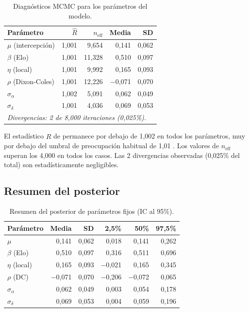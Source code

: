 \documentclass[12pt,a4paper]{article}
\begin{document}
\begin{table}[H]
\centering
\caption{Diagnósticos MCMC para los parámetros del modelo.}
\label{tab:diagnostics}
\begin{tabular}{lrrrr}
\toprule
\textbf{Parámetro} & $\hat{R}$ & $n_{\text{eff}}$ & \textbf{Media} & \textbf{SD} \\
\midrule
$\mu$ (intercepción)  & 1{,}001 & 9{,}654  &  0{,}141 & 0{,}062 \\
$\beta$ (Elo)         & 1{,}001 & 11{,}328 &  0{,}510 & 0{,}097 \\
$\eta$ (local)        & 1{,}001 &  9{,}992 &  0{,}165 & 0{,}093 \\
$\rho$ (Dixon-Coles)  & 1{,}001 & 12{,}226 & $-$0{,}071 & 0{,}070 \\
$\sigma_\alpha$       & 1{,}002 &  5{,}091 &  0{,}062 & 0{,}049 \\
$\sigma_\delta$       & 1{,}001 &  4{,}036 &  0{,}069 & 0{,}053 \\
\midrule
\multicolumn{5}{l}{\textit{Divergencias: 2 de 8{,}000 iteraciones (0{,}025\%).}} \\
\bottomrule
\end{tabular}
\end{table}

El estadístico $\hat{R}$ de \citet{gelman1992inference} permanece por debajo
de 1{,}002 en todos los parámetros, muy por debajo del umbral de preocupación
habitual de 1{,}01 \citep{vehtari2021rank}.
Los valores de $n_{\text{eff}}$ superan los 4{,}000 en todos los casos.
Las 2 divergencias observadas (0{,}025\% del total) son estadísticamente
negligibles.

\subsection{Resumen del posterior}

\begin{table}[H]
\centering
\caption{Resumen del posterior de parámetros fijos (IC al 95\%).}
\label{tab:posterior}
\begin{tabular}{lrrrrr}
\toprule
\textbf{Parámetro} & \textbf{Media} & \textbf{SD} & \textbf{2{,}5\%} & \textbf{50\%} & \textbf{97{,}5\%} \\
\midrule
$\mu$              &  0{,}141 & 0{,}062 &  0{,}018 &  0{,}141 &  0{,}262 \\
$\beta$ (Elo)      &  0{,}510 & 0{,}097 &  0{,}316 &  0{,}511 &  0{,}696 \\
$\eta$ (local)     &  0{,}165 & 0{,}093 & $-$0{,}021 &  0{,}165 &  0{,}345 \\
$\rho$ (DC)        & $-$0{,}071 & 0{,}070 & $-$0{,}206 & $-$0{,}072 &  0{,}065 \\
$\sigma_\alpha$    &  0{,}062 & 0{,}049 &  0{,}003 &  0{,}054 &  0{,}178 \\
$\sigma_\delta$    &  0{,}069 & 0{,}053 &  0{,}004 &  0{,}059 &  0{,}196 \\
\bottomrule
\end{tabular}
\end{table}
\end{document}
